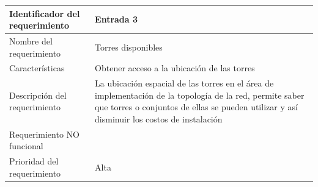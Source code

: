 \documentclass[]{article}
\begin{document}
\begin{longtable}[]{@{}ll@{}}
\toprule
\begin{minipage}[b]{0.39\columnwidth}\raggedright\strut
Identificador del requerimiento\strut
\end{minipage} & \begin{minipage}[b]{0.50\columnwidth}\raggedright\strut
Entrada 3\strut
\end{minipage}\tabularnewline
\midrule
\endhead
\begin{minipage}[t]{0.39\columnwidth}\raggedright\strut
Nombre del requerimiento\strut
\end{minipage} & \begin{minipage}[t]{0.50\columnwidth}\raggedright\strut
Torres disponibles\strut
\end{minipage}\tabularnewline
\begin{minipage}[t]{0.39\columnwidth}\raggedright\strut
Características\strut
\end{minipage} & \begin{minipage}[t]{0.50\columnwidth}\raggedright\strut
Obtener acceso a la ubicación de las torres\strut
\end{minipage}\tabularnewline
\begin{minipage}[t]{0.39\columnwidth}\raggedright\strut
Descripción del requerimiento\strut
\end{minipage} & \begin{minipage}[t]{0.50\columnwidth}\raggedright\strut
La ubicación espacial de las torres en el área de implementación de la
topología de la red, permite saber que torres o conjuntos de ellas se
pueden utilizar y así disminuir los costos de instalación\strut
\end{minipage}\tabularnewline
\begin{minipage}[t]{0.39\columnwidth}\raggedright\strut
Requerimiento NO funcional\strut
\end{minipage} & \begin{minipage}[t]{0.50\columnwidth}\raggedright\strut
\strut
\end{minipage}\tabularnewline
\begin{minipage}[t]{0.39\columnwidth}\raggedright\strut
Prioridad del requerimiento\strut
\end{minipage} & \begin{minipage}[t]{0.50\columnwidth}\raggedright\strut
Alta\strut
\end{minipage}\tabularnewline
\bottomrule
\end{longtable}
\end{document}
